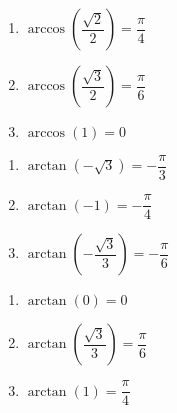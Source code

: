 \begin{multicols}{3} 

\begin{enumerate}

\setcounter{enumi}{\value{HW}}

\item $\arccos \left( \dfrac{\sqrt{2}}{2} \right) = \dfrac{\pi}{4}$
\item $\arccos \left( \dfrac{\sqrt{3}}{2} \right) = \dfrac{\pi}{6}$
\item $\arccos \left( 1 \right) = 0$ 

\setcounter{HW}{\value{enumi}}

\end{enumerate}

\end{multicols}

\begin{multicols}{3} 

\begin{enumerate}

\setcounter{enumi}{\value{HW}}

\item $\arctan \left( -\sqrt{3} \right) = -\dfrac{\pi}{3}$ 
\item $\arctan \left( -1 \right) = -\dfrac{\pi}{4}$ 
\item $\arctan \left( -\dfrac{\sqrt{3}}{3} \right) = -\dfrac{\pi}{6}$

\setcounter{HW}{\value{enumi}}

\end{enumerate}

\end{multicols}

\begin{multicols}{3} 

\begin{enumerate}

\setcounter{enumi}{\value{HW}}

\item $\arctan \left( 0 \right) = 0$ 
\item $\arctan \left( \dfrac{\sqrt{3}}{3} \right) = \dfrac{\pi}{6}$
\item $\arctan \left( 1 \right) = \dfrac{\pi}{4}$ 

\setcounter{HW}{\value{enumi}}

\end{enumerate}

\end{multicols}

